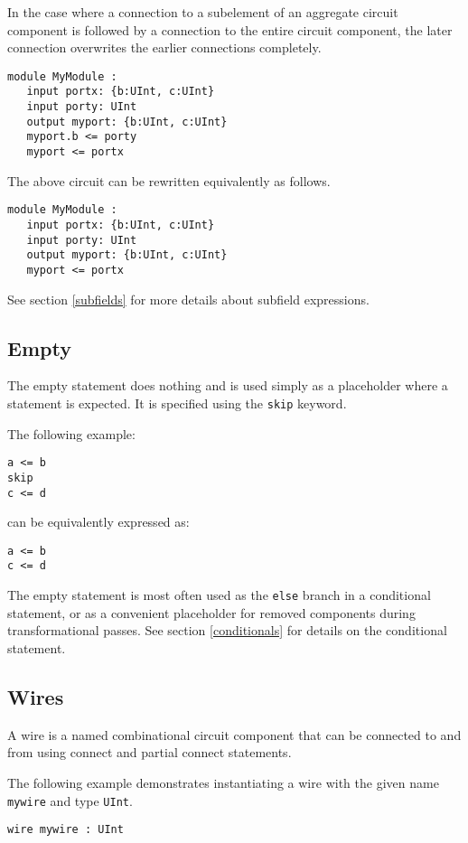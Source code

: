 \documentclass[12pt]{article}
\begin{document}
In the case where a connection to a subelement of an aggregate circuit component is followed by a connection to the entire circuit component, the later connection overwrites the earlier connections completely.

\begin{lstlisting}
module MyModule :
   input portx: {b:UInt, c:UInt}
   input porty: UInt
   output myport: {b:UInt, c:UInt}
   myport.b <= porty
   myport <= portx
\end{lstlisting}
The above circuit can be rewritten equivalently as follows.
\begin{lstlisting}
module MyModule :
   input portx: {b:UInt, c:UInt}
   input porty: UInt
   output myport: {b:UInt, c:UInt}
   myport <= portx
\end{lstlisting}

See section \ref{subfields} for more details about subfield expressions.

\subsection{Empty}
The empty statement does nothing and is used simply as a placeholder where a statement is expected. It is specified using the \verb|skip| keyword.

The following example:
\begin{lstlisting}
a <= b
skip
c <= d
\end{lstlisting}
can be equivalently expressed as:
\begin{lstlisting}
a <= b
c <= d
\end{lstlisting}

The empty statement is most often used as the \verb|else| branch in a conditional statement, or as a convenient placeholder for removed components during transformational passes. See section \ref{conditionals} for details on the conditional statement.

\subsection{Wires}
A wire is a named combinational circuit component that can be connected to and from using connect and partial connect statements.

The following example demonstrates instantiating a wire with the given name \verb|mywire| and type \verb|UInt|.

\begin{lstlisting}
wire mywire : UInt
\end{lstlisting}
\end{document}
